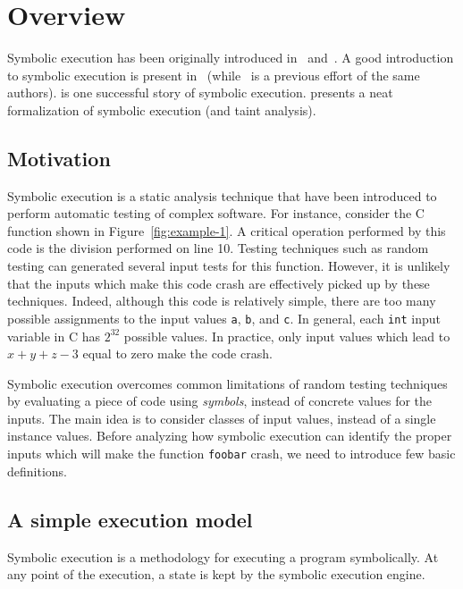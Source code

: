 
\section{Overview}

Symbolic execution has been originally introduced in~\cite{K-CACM76} and~\cite{H-TSE77}. A good introduction to symbolic execution is present in~\cite{KLEE-OSDI08} (while~\cite{EXE-CCS06} is a previous effort of the same authors). \cite{SAGE-NDSS08} is one successful story of symbolic execution. \cite{SAB-SP10} presents a neat formalization of symbolic execution (and taint analysis).

\subsection{Motivation}

Symbolic execution is a static analysis technique that have been introduced to perform automatic testing of complex software. For instance, consider the C function shown in Figure~\ref{fig:example-1}. A critical operation performed by this code is the division performed on line 10. Testing techniques such as random testing can generated several input tests for this function. However, it is unlikely that the inputs which make this code crash are effectively picked up by these techniques. Indeed, although this code is relatively simple, there are too many possible assignments to the input values {\tt a}, {\tt b}, and {\tt c}. In general, each {\tt int} input variable in C has $2^{32}$ possible values. In practice, only input values which lead to $x + y + z - 3$ equal to zero make the code crash.

Symbolic execution overcomes common limitations of random testing techniques by evaluating a piece of code using {\em symbols}, instead of concrete values for the inputs. The main idea is to consider classes of input values, instead of a single instance values. Before analyzing how symbolic execution can identify the proper inputs which will make the function {\tt foobar} crash, we need to introduce few basic definitions.

\subsection{A simple execution model}
\label{simple-execution-model}

Symbolic execution is a methodology for executing a program symbolically. At any point of the execution, a state is kept by the symbolic execution engine.

